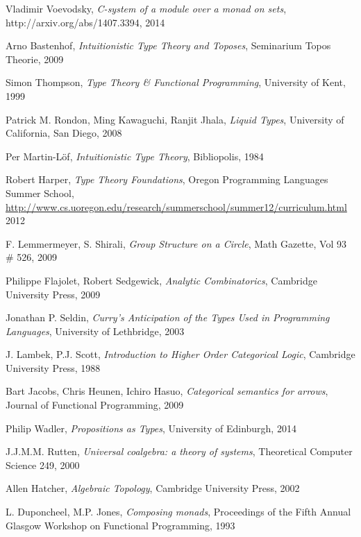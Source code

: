 \documentclass{article}
\begin{document}
\begin{thebibliography}{99}
    Vladimir Voevodsky,
    \emph{C-system of a module over a monad on sets},
    http://arxiv.org/abs/1407.3394,
    2014

    Arno Bastenhof,
    \emph{Intuitionistic Type Theory and Toposes},
    Seminarium Topos Theorie,
    2009

    Simon Thompson,
    \emph{Type Theory \& Functional Programming},
    University of Kent,
    1999

    Patrick M. Rondon, Ming Kawaguchi, Ranjit Jhala,
    \emph{Liquid Types},
    University of California, San Diego,
    2008

    Per Martin-L\"of,
    \emph{Intuitionistic Type Theory},
    Bibliopolis,
    1984

    Robert Harper,
    \emph{Type Theory Foundations},
    Oregon Programming Languages Summer School,
    \url{http://www.cs.uoregon.edu/research/summerschool/summer12/curriculum.html}
    2012

    F. Lemmermeyer, S. Shirali,
    \emph{Group Structure on a Circle},
    Math Gazette, Vol 93 \# 526,
    2009

    Philippe Flajolet, Robert Sedgewick,
    \emph{Analytic Combinatorics},
    Cambridge University Press,
    2009

    Jonathan P. Seldin,
    \emph{Curry's Anticipation of the Types Used in Programming Languages},
    University of Lethbridge,
    2003

    J. Lambek, P.J. Scott,
    \emph{Introduction to Higher Order Categorical Logic},
    Cambridge University Press,
    1988

    Bart Jacobs, Chris Heunen, Ichiro Hasuo,
    \emph{Categorical semantics for arrows},
    Journal of Functional Programming,
    2009

    Philip Wadler,
    \emph{Propositions as Types},
    University of Edinburgh,
    2014

    J.J.M.M. Rutten,
    \emph{Universal coalgebra: a theory of systems},
    Theoretical Computer Science 249,
    2000

    Allen Hatcher,
    \emph{Algebraic Topology},
    Cambridge University Press,
    2002

    L. Duponcheel, M.P. Jones,
    \emph{Composing monads},
    Proceedings of the Fifth Annual Glasgow Workshop
      on Functional Programming,
    1993


\end{thebibliography}
\end{document}
